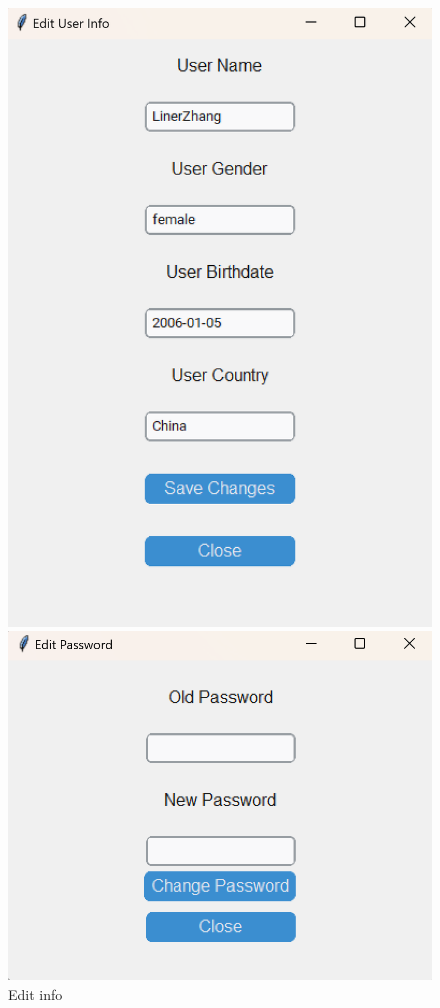 \documentclass[12pt]{article}
\begin{document}
\begin{figure}[H]
    \centering
    \begin{minipage}{0.45\textwidth}
        \centering
        \includegraphics[width=\textwidth]{8.png}
        \caption{Edit info}
        \label{Figure 8}
    \end{minipage}
    \hfill
    \begin{minipage}{0.45\textwidth}
        \centering
        \includegraphics[width=\textwidth]{9.png}

\end{minipage}
\end{figure}
\end{document}
